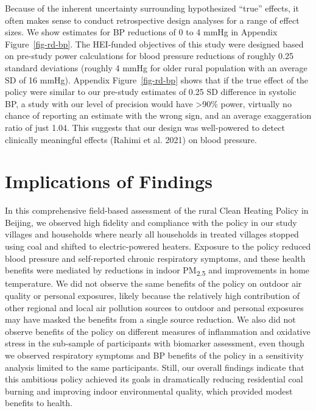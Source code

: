 \documentclass[
  letterpaper,
  DIV=11,
  numbers=noendperiod]{scrartcl}
\begin{document}
Because of the inherent uncertainty surrounding hypothesized ``true''
effects, it often makes sense to conduct retrospective design analyses
for a range of effect sizes. We show estimates for BP reductions of 0 to
4 mmHg in Appendix Figure~\ref{fig-rd-bp}. The HEI-funded objectives of
this study were designed based on pre-study power calculations for blood
pressure reductions of roughly 0.25 standard deviations (roughly 4 mmHg
for older rural population with an average SD of 16 mmHg). Appendix
Figure~\ref{fig-rd-bp} shows that if the true effect of the policy were
similar to our pre-study estimates of 0.25 SD difference in systolic BP,
a study with our level of precision would have \textgreater90\% power,
virtually no chance of reporting an estimate with the wrong sign, and an
average exaggeration ratio of just 1.04. This suggests that our design
was well-powered to detect clinically meaningful effects (Rahimi et al.
2021) on blood pressure.

\section{Implications of Findings}\label{implications-of-findings}

In this comprehensive field-based assessment of the rural Clean Heating
Policy in Beijing, we observed high fidelity and compliance with the
policy in our study villages and households where nearly all households
in treated villages stopped using coal and shifted to electric-powered
heaters. Exposure to the policy reduced blood pressure and self-reported
chronic respiratory symptoms, and these health benefits were mediated by
reductions in indoor PM\textsubscript{2.5} and improvements in home
temperature. We did not observe the same benefits of the policy on
outdoor air quality or personal exposures, likely because the relatively
high contribution of other regional and local air pollution sources to
outdoor and personal exposures may have masked the benefits from a
single source reduction. We also did not observe benefits of the policy
on different measures of inflammation and oxidative stress in the
sub-sample of participants with biomarker assessment, even though we
observed respiratory symptoms and BP benefits of the policy in a
sensitivity analysis limited to the same participants. Still,
our overall findings indicate that this ambitious policy
achieved its goals in dramatically reducing residential coal burning and
improving indoor environmental quality, which provided modest benefits
to health.
\end{document}
